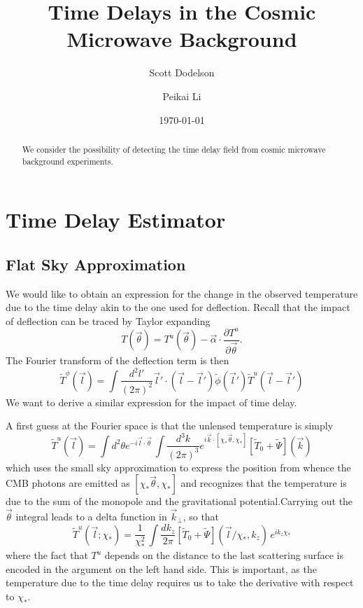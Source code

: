 \documentclass[prd,amsmath,amssymb,floatfix,superscriptaddress,nofootinbib,preprintnumbers]{revtex4-1}
\newcommand{\eql}[1]{\label{eq:#1}}
\begin{document}
\title{\Large Time Delays in the Cosmic Microwave Background}


\author{\large Scott Dodelson}
\author{\large Peikai Li}

\date{\today}

\begin{abstract}
We consider the possibility of detecting the time delay field from cosmic microwave background experiments.
\end{abstract}

\maketitle

\section{Time Delay Estimator}

\subsection{Flat Sky Approximation} We would like to obtain an expression for the change in the observed temperature due to the time delay akin to the one used for deflection. Recall that the impact of deflection can be traced by Taylor expanding
\begin{equation}
T(\vec\theta) = T^u(\vec\theta) - \vec\alpha\cdot \frac{\partial T^u}{\partial\vec\theta}.
\end{equation}
The Fourier transform of the deflection term is then
\begin{equation}
\tilde T^\phi(\vec l) =\int \frac{d^2l'}{(2\pi)^2} \vec l'\cdot (\vec l-\vec l') \tilde\phi(\vec l') \tilde T^u(\vec l-\vec l')
\eql{tphi}\end{equation}
We want to derive a similar expression for the impact of time delay. 

A first guess at the Fourier space is
that the unlensed temperature is simply
\begin{equation}
\tilde T^u(\vec l) = \int d^2\theta e^{-i\vec l\cdot \vec\theta}\, \int \frac{d^3k}{(2\pi)^3} e^{i\vec k\cdot [\chi_*\vec\theta,\chi_*]}  [\tilde T_0+\tilde\Psi](\vec k)
\end{equation}
which uses the small sky approximation to express the position from whence the CMB photons are emitted as $[\chi_*\vec\theta,\chi_*]$ and recognizes that the temperature is due to the sum of the monopole and the gravitational potential.Carrying out the $\vec\theta$ integral leads to a delta function in $\vec k_\perp$, so that 
\begin{equation}
\tilde T^u(\vec l;\chi_*) = 
\frac{1}{\chi_*^2}\, \int \frac{dk_z}{2\pi}  [\tilde T_0+\tilde\Psi](\vec l/\chi_*,k_z)\,e^{ik_z\chi_*}
\end{equation}
where the fact that $T^u$ depends on the distance to the last scattering surface is encoded in the argument on the left hand side.
This is important, as the temperature due to the time delay requires us to take the derivative with respect to $\chi_*$.
\end{document}
